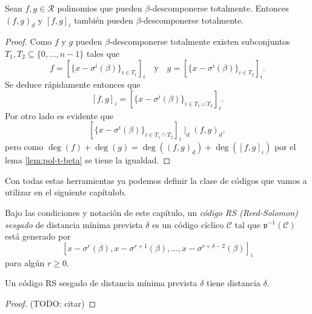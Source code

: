 \begin{lemma}
  \label{lem:b-descomposicion-mcm-mcd}
  Sean \(f, g \in \mathcal R\) polinomios que pueden \(\beta\)-descomponerse totalmente.
  Entonces \((f, g)_d\) y \([f, g]_i\) también pueden \(\beta\)-descomponerse totalmente.
\end{lemma}

\begin{proof}
  Como \(f\) y \(g\) pueden \(\beta\)-descomponerse totalmente existen subconjuntos \(T_1, T_2 \subseteq \{0, \dots, n - 1\}\) tales que 
  \[
    f = \left[\{x - \sigma^i(\beta)\}_{i \in T_1}\right]_i \quad \text{y} \quad g = \left[\{x - \sigma^i(\beta)\}_{i \in T_2}\right]_i.
  \]
  Se deduce rápidamente entonces que
  \[
    [f, g]_i = \left[\{x - \sigma^i(\beta)\}_{i \in T_1 \cup T_2}\right]_i.
  \]
  Por otro lado es evidente que 
  \[
    \left[\{x - \sigma^i(\beta)\}_{i \in T_1 \cap T_2}\right]_i \mid_d (f, g)_d,
  \]
  pero como \(\deg(f) + \deg(g) = \deg((f, g)_d) + \deg([f, g]_i)\) por el lema \ref{lem:pol-t-beta} se tiene la igualdad.
\end{proof}

Con todas estas herramientas ya podemos definir la clase de códigos que vamos a utilizar en el siguiente capítulob.

\begin{definition}
  Bajo las condiciones y notación de este capítulo, un \emph{código RS (Reed-Solomon) sesgado} de distancia mínima prevista \(\delta\) es un código cíclico \(\mathcal C\) tal que \(\mathfrak v^{-1}(\mathcal C)\) está generado por 
  \[
    \left[x - \sigma^r(\beta), x - \sigma^{r+1}(\beta), \dots, x - \sigma^{r+\delta-2}(\beta)\right]_i
  \] 
  para algún \(r \geq 0\).
\end{definition}

\begin{theorem}
  \label{th:distancia-skew-rs}
  Un código RS sesgado de distancia mínima prevista \(\delta\) tiene distancia \(\delta\).
\end{theorem}

\begin{proof}
  (TODO: citar)
\end{proof}
